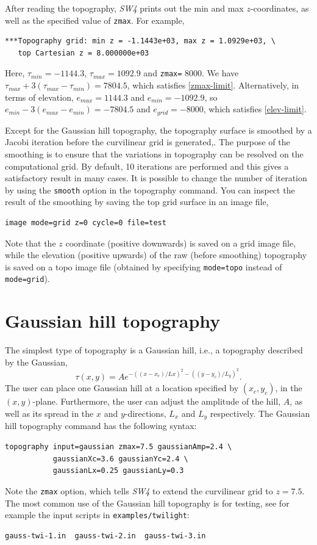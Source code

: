 \documentclass[11pt]{report}
\begin{document}
After reading the topography, \emph{SW4} prints out the min and max $z$-coordinates, as well as the
specified value of \verb+zmax+. For example,
\begin{verbatim}
***Topography grid: min z = -1.1443e+03, max z = 1.0929e+03, \
   top Cartesian z = 8.000000e+03
\end{verbatim}
Here, $\tau_{min} = -1144.3$, $\tau_{max} = 1092.9$ and \verb+zmax=+ 8000.  We have $\tau_{max} +
3(\tau_{max}-\tau_{min})=7804.5$, which satisfies \eqref{zmax-limit}. Alternatively, in terms of
elevation, $e_{max}=1144.3$ and $e_{min}=-1092.9$, so $e_{min} - 3(e_{max}-e_{min}) = -7804.5$ and
$e_{grid}=-8000$, which satisfies \eqref{elev-limit}.

Except for the Gaussian hill topography, the topography surface is smoothed by a Jacobi iteration
before the curvilinear grid is generated,. The purpose of the smoothing is to ensure that the
variations in topography can be resolved on the computational grid. By default, 10 iterations are
performed and this gives a satisfactory result in many cases. It is possible to change the number of
iteration by using the \verb+smooth+ option in the topography command. You can inspect the result of
the smoothing by saving the top grid surface in an image file,
\begin{verbatim}
image mode=grid z=0 cycle=0 file=test
\end{verbatim}
Note that the $z$ coordinate (positive downwards) is saved on a grid image file, while the elevation
(positive upwards) of the raw (before smoothing) topography is saved on a topo image file (obtained by
specifying \verb+mode=topo+ instead of \verb+mode=grid+).

\section{Gaussian hill topography}\label{sec:topo-gauss-hill}
The simplest type of topography is a Gaussian hill, i.e., a topography described by the Gaussian,
\[
  \tau(x,y)= A e^{-( (x-x_c)/Lx )^2 - ( (y-y_c)/L_y )^2}.
\]
The user can place one Gaussian hill at a location specified by $(x_c,y_c)$, in the $(x,y)$-plane.
Furthermore, the user can adjust the amplitude of the hill, $A$, as well as
its spread in the $x$ and $y$-directions, $L_x$ and $L_y$ respectively. 
The Gaussian hill topography command has the following syntax:
\begin{verbatim}
topography input=gaussian zmax=7.5 gaussianAmp=2.4 \
           gaussianXc=3.6 gaussianYc=2.4 \
           gaussianLx=0.25 gaussianLy=0.3
\end{verbatim}
Note the \verb+zmax+ option, which tells \emph{SW4} to extend the curvilinear grid to $z=7.5$.
The most common use of the Gaussian hill topography is for testing, see for example the input
scripts in \verb+examples/twilight+:
\begin{verbatim}
gauss-twi-1.in  gauss-twi-2.in  gauss-twi-3.in 
\end{verbatim}
\end{document}
